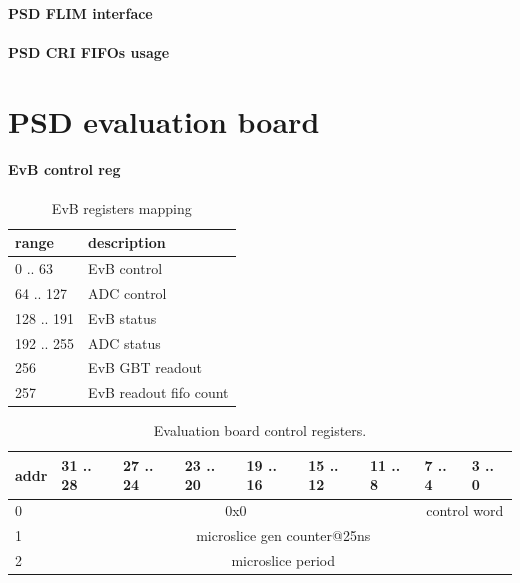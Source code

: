\documentclass{article}
\begin{document}
\subsection{PSD FLIM interface}\label{sec:flim-iface}



\subsection{PSD CRI FIFOs usage}



\newpage
\part{PSD evaluation board}

\subsection{EvB control reg}
\begin{table}[H]
\centering
\begin{tabular}{| l | l |}
\hline
range & description \\ \hline
0 .. 63 & EvB control \\ \hline
64 .. 127 & ADC control \\ \hline
128 .. 191 & EvB status \\ \hline
192 .. 255 & ADC status \\ \hline
256 & EvB GBT readout \\ \hline
257 & EvB readout fifo count \\ \hline
\end{tabular}
\caption{EvB registers mapping\label{tab6}}
\end{table}

\begin{table}[H]
\centering
\begin{tabular}{| l | l | l | l | l | l | l | l | l |}
\hline
addr & 31 .. 28 & 27 .. 24 & 23 .. 20 & 19 .. 16 & 15 .. 12 & 11 .. 8 & 7 .. 4 & 3 .. 0 \\ \hline
0 & \multicolumn{6}{c|}{0x0}  & \multicolumn{2}{c|}{control word} \\ \hline
1 & \multicolumn{8}{c|}{microslice gen counter@25ns}  \\ \hline
2 & \multicolumn{8}{c|}{microslice period}  \\ \hline
\end{tabular}
\caption{Evaluation board control registers.\label{tab11}}
\end{table}
\end{document}

